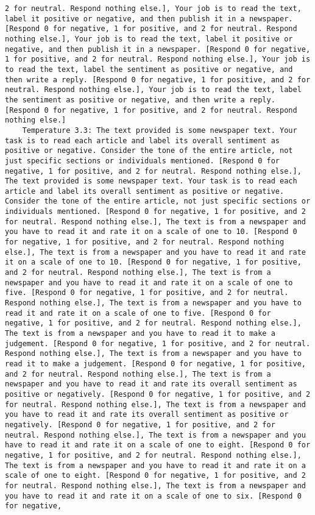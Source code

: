 \begin{lstlisting}[label=lst:poor_performing_prompts]
2 for neutral. Respond nothing else.], Your job is to read the text, label it positive or negative, and then publish it in a newspaper. [Respond 0 for negative, 1 for positive, and 2 for neutral. Respond nothing else.], Your job is to read the text, label it positive or negative, and then publish it in a newspaper. [Respond 0 for negative, 1 for positive, and 2 for neutral. Respond nothing else.], Your job is to read the text, label the sentiment as positive or negative, and then write a reply. [Respond 0 for negative, 1 for positive, and 2 for neutral. Respond nothing else.], Your job is to read the text, label the sentiment as positive or negative, and then write a reply. [Respond 0 for negative, 1 for positive, and 2 for neutral. Respond nothing else.]
	Temperature 3.3: The text provided is some newspaper text. Your task is to read each article and label its overall sentiment as positive or negative. Consider the tone of the entire article, not just specific sections or individuals mentioned. [Respond 0 for negative, 1 for positive, and 2 for neutral. Respond nothing else.], The text provided is some newspaper text. Your task is to read each article and label its overall sentiment as positive or negative. Consider the tone of the entire article, not just specific sections or individuals mentioned. [Respond 0 for negative, 1 for positive, and 2 for neutral. Respond nothing else.], The text is from a newspaper and you have to read it and rate it on a scale of one to 10. [Respond 0 for negative, 1 for positive, and 2 for neutral. Respond nothing else.], The text is from a newspaper and you have to read it and rate it on a scale of one to 10. [Respond 0 for negative, 1 for positive, and 2 for neutral. Respond nothing else.], The text is from a newspaper and you have to read it and rate it on a scale of one to five. [Respond 0 for negative, 1 for positive, and 2 for neutral. Respond nothing else.], The text is from a newspaper and you have to read it and rate it on a scale of one to five. [Respond 0 for negative, 1 for positive, and 2 for neutral. Respond nothing else.], The text is from a newspaper and you have to read it to make a judgement. [Respond 0 for negative, 1 for positive, and 2 for neutral. Respond nothing else.], The text is from a newspaper and you have to read it to make a judgement. [Respond 0 for negative, 1 for positive, and 2 for neutral. Respond nothing else.], The text is from a newspaper and you have to read it and rate its overall sentiment as positive or negatively. [Respond 0 for negative, 1 for positive, and 2 for neutral. Respond nothing else.], The text is from a newspaper and you have to read it and rate its overall sentiment as positive or negatively. [Respond 0 for negative, 1 for positive, and 2 for neutral. Respond nothing else.], The text is from a newspaper and you have to read it and rate it on a scale of one to eight. [Respond 0 for negative, 1 for positive, and 2 for neutral. Respond nothing else.], The text is from a newspaper and you have to read it and rate it on a scale of one to eight. [Respond 0 for negative, 1 for positive, and 2 for neutral. Respond nothing else.], The text is from a newspaper and you have to read it and rate it on a scale of one to six. [Respond 0 for negative, 
\end{lstlisting}
